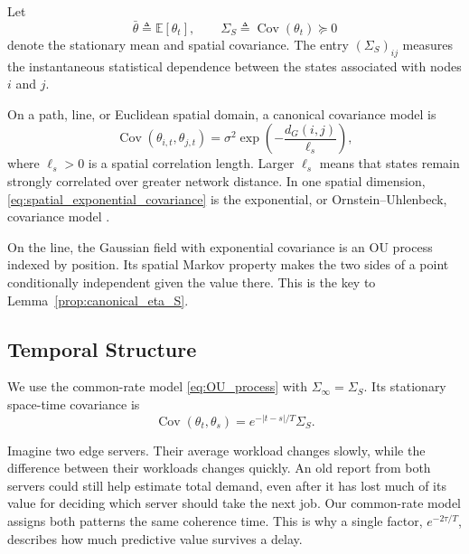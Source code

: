 \documentclass[11pt]{article}
\begin{document}
Let
\begin{equation}
    \bar{\theta}
    \triangleq
    \mathbb{E}[\theta_t],
    \qquad
    \Sigma_S
    \triangleq
    \operatorname{Cov}(\theta_t)
    \succeq 0
    \label{eq:spatial_covariance_general}
\end{equation}
denote the stationary mean and spatial covariance. The entry
$(\Sigma_S)_{ij}$ measures the instantaneous statistical dependence between
the states associated with nodes $i$ and $j$.

On a path, line, or Euclidean spatial domain, a canonical covariance model is
\begin{equation}
    \operatorname{Cov}
    \left(
        \theta_{i,t},
        \theta_{j,t}
    \right)
    =
    \sigma^2
    \exp
    \left(
        -\frac{d_G(i,j)}{\ell_s}
    \right),
    \label{eq:spatial_exponential_covariance}
\end{equation}
where $\ell_s>0$ is a spatial correlation length. Larger $\ell_s$ means that
states remain strongly correlated over greater network distance. In one
spatial dimension, \eqref{eq:spatial_exponential_covariance} is the
exponential, or Ornstein--Uhlenbeck, covariance model
\cite{williams2006gaussian}.

On the line, the Gaussian field with exponential covariance is an OU process
indexed by position. Its spatial Markov property makes the two sides of a
point conditionally independent given the value there. This is the key to
Lemma~\ref{prop:canonical_eta_S}.

\subsection{Temporal Structure}
\label{subsec:temporal_structure}

We use the common-rate model \eqref{eq:OU_process} with
$\Sigma_\infty=\Sigma_S$. Its stationary space-time covariance is
\begin{equation}
    \operatorname{Cov}(\theta_t,\theta_s)
    =e^{-|t-s|/T}\Sigma_S.
    \label{eq:separable_space_time_covariance}
\end{equation}

Imagine two edge servers. Their average workload changes slowly, while the
difference between their workloads changes quickly. An old report from both
servers could still help estimate total demand, even after it has lost much of
its value for deciding which server should take the next job. Our common-rate
model assigns both patterns the same coherence time. This is why a single
factor, $e^{-2\tau/T}$, describes how much predictive value survives a delay.
\end{document}
